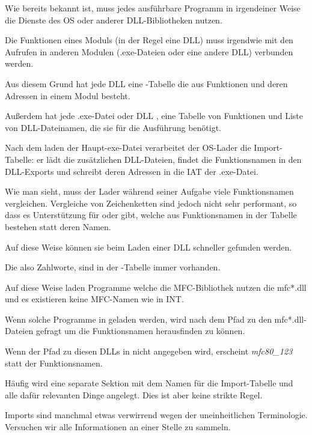 \label{PE_exports_imports}
Wie bereits bekannt ist, muss jedes ausführbare Programm in irgendeiner Weise die
Dienste des \ac{OS} oder anderer DLL-Bibliotheken nutzen.

Die Funktionen eines Moduls (in der Regel eine DLL) muss irgendwie mit den Aufrufen
in anderen Modulen (.exe-Dateien oder eine andere DLL) verbunden werden.

Aus diesem Grund hat jede DLL eine -Tabelle die aus Funktionen und deren
Adressen in einem Modul besteht.

Außerdem hat jede .exe-Datei oder DLL , eine Tabelle von Funktionen und
Liste von DLL-Dateinamen, die sie für die Ausführung benötigt.

Nach dem laden der Haupt-exe-Datei verarbeitet der \ac{OS}-Lader die Import-Tabelle:
er lädt die zusätzlichen DLL-Dateien, findet die Funktionsnamen in den DLL-Exports
und schreibt deren Adressen in die \ac{IAT} der .exe-Datei.


Wie man sieht, muss der Lader während seiner Aufgabe viele Funktionsnamen vergleichen.
Vergleiche von Zeichenketten sind jedoch nicht sehr performant, so dass es Unterstützung
für  oder  gibt, welche aus Funktionsnamen in der Tabelle
bestehen statt deren Namen.

Auf diese Weise können sie beim Laden einer DLL schneller gefunden werden.

Die  also Zahlworte, sind in der -Tabelle immer vorhanden.

Auf diese Weise laden Programme welche die \ac{MFC}-Bibliothek nutzen die mfc*.dll
und es existieren keine \ac{MFC}-Namen wie in \ac{INT}.

Wenn solche Programme in \IDA geladen werden, wird nach dem Pfad zu den mfc*.dll-Dateien
gefragt um die Funktionsnamen herausfinden zu können.

Wenn der Pfad zu diesen DLLs in \IDA nicht angegeben wird, erscheint \emph{mfc80\_123}
statt der Funktionsnamen.


Häufig wird eine separate Sektion mit dem Namen  für die Import-Tabelle
und alle dafür relevanten Dinge angelegt. Dies ist aber keine strikte Regel.

Imports sind manchmal etwas verwirrend wegen der uneinheitlichen Terminologie.
Versuchen wir alle Informationen an einer Stelle zu sammeln.

